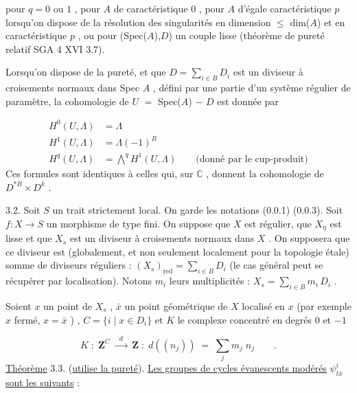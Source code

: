 pour  $q = 0$ ou $1$ , pour  $A$  de caractéristique  $0$ , pour  $A$  d'égale caractéristique  $p$  lorsqu'on dispose de la résolution des singularités en dimension $\leqslant$ dim($A$)  et en caractéristique  $p$ , ou pour  (Spec($A$),$D$)  un couple lisse (théorème de pureté relatif  SGA 4 XVI 3.7).

Lorsqu'on dispose de la pureté, et que  $D = \sum\limits_{i \in B} D_{i}$  est un diviseur à croisements normaux dans  Spec $A$ , défini par une partie d'un système régulier de paramètre, la cohomologie de  $U$ $=$ Spec($A$) $-$ $D$  est donnée par



\begin{equation}\tag{3.1.2}
\begin{aligned} H^{0}(U,\Lambda) &= \Lambda \\[4pt] H^{1}(U,\Lambda) &= \Lambda(-1)^{B} \\[4pt] H^{q}(U,\Lambda) &= \overset{q}{\bigwedge} H^{1}(U,\Lambda) \qquad \text{(donné par le cup-produit)} \end{aligned}
\end{equation}
Ces formules sont identiques à celles qui, sur  $\mathbb{C}$ , donnent la cohomologie de $D^{*B} \times D^{k}$ .

3.2. Soit  $S$  un trait strictement local. On garde les notations (0.0.1) (0.0.3). Soit  $f : X \longrightarrow S$  un morphisme de type fini. On suppose que  $X$  est régulier, que  $X_{\eta}$  est lisse et que  $X_{s}$  est un diviseur à croisements normaux dans  $X$ . On supposera que ce diviseur est (globalement, et non seulement localement pour la topologie étale) somme de diviseurs réguliers : $(X_{s})_{\mathrm{red}} = \sum\limits_{i \in B} D_{i}$  (le cas général peut se récupérer par localisation). Notons  $m_{i}$  leurs multiplicités : $X_{s} = \sum\limits_{i \in B} m_{i}\, D_{i}$ .

Soient  $x$  un point de  $X_{s}$ , $\bar{x}$  un point géométrique de  $X$  localisé en  $x$  (par exemple  $x$  fermé,  $x = \bar{x}$ ) ,  $C = \{i \mid x \in D_{i}\}$  et  $K$  le complexe concentré en degrés  $0$  et  $-1$

\begin{equation*}
K \;:\; \mathbf{Z}^{C} \;\xrightarrow{\;\;d\;\;}\; \mathbf{Z} \;:\; d((n_{j})) \;=\; \sum\limits_{j} m_{j}\; n_{j} \qquad .
\end{equation*}
\underline{Théorème} 3.3. (\underline{utilise la pureté}). \underline{Les groupes de cycles évanescents modérés} $\psi^{i}_{t\bar{x}}$ \underline{sont les suivants} :


